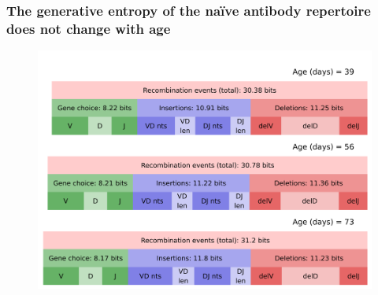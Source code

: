 \documentclass[presentation]{beamer}
\newlength{\slideheight}
\begin{document}
\begin{frame}
\frametitle{The generative entropy of the na\"ive antibody repertoire does not change with age}
\begin{figure}
\includegraphics[height=0.95\slideheight]{../_Figures/png/ageing-igor-entropies}
\end{figure}
\end{frame}
\end{document}
